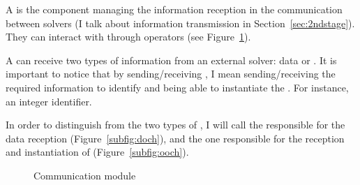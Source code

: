 
A \opch{} is the component managing the information reception in the communication between solvers (I talk about information transmission in Section~\ref{sec:2ndstage}). They can interact with \oms{} through operators (see Figure~\ref{fig:och}).

A \opch{} can receive two types of information from an external solver: data or \oms{}. It is important to notice that by sending/receiving \oms, I mean sending/receiving the required information to identify and being able to instantiate the \om. For instance, an integer identifier.

In order to distinguish from the two types of \opchs, I will call \INTROdopch{} the \opch{} responsible for the data reception (Figure~\ref{subfig:doch}), and \INTROoopch{} the one responsible for the reception and instantiation of \oms{} (Figure~\ref{subfig:ooch}).


%

\begin{figure}
	\centering
	\hspace{0.05\textwidth}%
	\caption[]{Communication module}
	\label{fig:och}
\end{figure}

